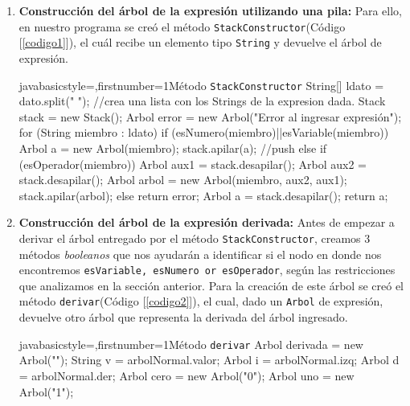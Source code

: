 \documentclass[letterpaper,11pt]{article} %
\begin{document}
\begin{enumerate}
\item \textbf{Construcción del árbol de la expresión utilizando una pila:}
\newp Para ello, en nuestro programa se creó el método \texttt{StackConstructor}(Código [\ref{codigo1}]), el cuál recibe un elemento tipo \texttt{String} y devuelve el árbol de expresión.

\begin{sourcecodep}[\label{codigo1}]{java}{basicstyle={\fontsize{9}{10}\selectfont\ttfamily},firstnumber=1}{Método \texttt{StackConstructor}}
	String[] ldato = dato.split(" "); //crea una lista con los Strings de la expresion dada.
	Stack stack = new Stack();
	Arbol error = new Arbol("Error al ingresar expresión");
	for (String miembro : ldato){
		if (esNumero(miembro)||esVariable(miembro)){
			Arbol a = new Arbol(miembro);
			stack.apilar(a);} //push
		else if (esOperador(miembro)){
			Arbol aux1 = stack.desapilar();
			Arbol aux2 = stack.desapilar();
			Arbol arbol = new Arbol(miembro, aux2, aux1);
			stack.apilar(arbol);}
		else return error;
	}
	Arbol a = stack.desapilar();
	return a;
\end{sourcecodep}

\item \textbf{Construcción del árbol de la expresión derivada:}
\newp Antes de empezar a derivar el árbol entregado por el método \texttt{StackConstructor}, creamos 3 métodos \textit{booleanos} que nos ayudarán a identificar si el nodo en donde nos encontremos \texttt{esVariable, esNumero or esOperador}, según las restricciones que analizamos en la sección anterior.
\newp Para la creación de este árbol se creó el método \texttt{derivar}(Código [\ref{codigo2}]), el cual, dado un \texttt{Arbol} de expresión, devuelve otro árbol que representa la derivada del árbol ingresado.

\begin{sourcecodep}[\label{codigo2}]{java}{basicstyle={\fontsize{9}{10}\selectfont\ttfamily},firstnumber=1}{Método \texttt{derivar}}
	Arbol derivada = new Arbol("");
	String v = arbolNormal.valor;
	Arbol i = arbolNormal.izq;
	Arbol d = arbolNormal.der;
	Arbol cero = new Arbol("0");
	Arbol uno = new Arbol("1");


\end{sourcecodep}
\end{enumerate}
\end{document}
